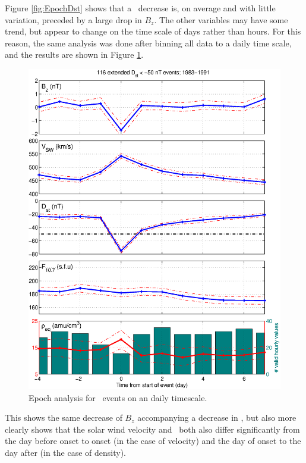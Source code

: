 Figure \ref{fig:EpochDst} shows that a \dst\ decrease is, on average and with little variation, preceded by a large drop in $B_z$. The other variables may have some trend, but appear to change on the time scale of days rather than hours. For this reason, the same analysis was done after binning all data to a daily time scale, and the results are shown in Figure \ref{fig:EpochDstDay}.

\begin{figure}[htp!]
	\centering
	\includegraphics[width=1\linewidth]{Figures/StormAvs/stormavs-dst-day-GOES6}
	\caption{Epoch analysis for \dst\ events on an daily timescale.}
	\label{fig:EpochDstDay}
\end{figure}

This shows the same decrease of $B_z$ accompanying a decrease in \dst, but also more clearly shows that the solar wind velocity and \req\ both also differ significantly from the day before onset to onset (in the case of velocity) and the day of onset to the day after (in the case of density). 

